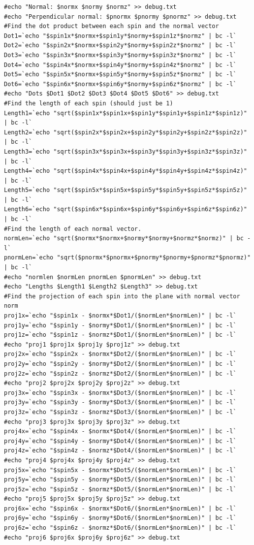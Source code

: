 \documentclass{article}
\begin{document}
\begin{lstlisting}
#echo "Normal: $normx $normy $normz" >> debug.txt
#echo "Perpendicular normal: $pnormx $pnormy $pnormz" >> debug.txt
#Find the dot product between each spin and the normal vector 
Dot1=`echo "$spin1x*$normx+$spin1y*$normy+$spin1z*$normz" | bc -l`
Dot2=`echo "$spin2x*$normx+$spin2y*$normy+$spin2z*$normz" | bc -l`
Dot3=`echo "$spin3x*$normx+$spin3y*$normy+$spin3z*$normz" | bc -l`
Dot4=`echo "$spin4x*$normx+$spin4y*$normy+$spin4z*$normz" | bc -l`
Dot5=`echo "$spin5x*$normx+$spin5y*$normy+$spin5z*$normz" | bc -l`
Dot6=`echo "$spin6x*$normx+$spin6y*$normy+$spin6z*$normz" | bc -l`
#echo "Dots $Dot1 $Dot2 $Dot3 $Dot4 $Dot5 $Dot6" >> debug.txt
#Find the length of each spin (should just be 1)
Length1=`echo "sqrt($spin1x*$spin1x+$spin1y*$spin1y+$spin1z*$spin1z)" | bc -l`
Length2=`echo "sqrt($spin2x*$spin2x+$spin2y*$spin2y+$spin2z*$spin2z)" | bc -l`
Length3=`echo "sqrt($spin3x*$spin3x+$spin3y*$spin3y+$spin3z*$spin3z)" | bc -l`
Length4=`echo "sqrt($spin4x*$spin4x+$spin4y*$spin4y+$spin4z*$spin4z)" | bc -l`
Length5=`echo "sqrt($spin5x*$spin5x+$spin5y*$spin5y+$spin5z*$spin5z)" | bc -l`
Length6=`echo "sqrt($spin6x*$spin6x+$spin6y*$spin6y+$spin6z*$spin6z)" | bc -l`
#Find the length of each normal vector.
normLen=`echo "sqrt($normx*$normx+$normy*$normy+$normz*$normz)" | bc -l`
pnormLen=`echo "sqrt($pnormx*$pnormx+$pnormy*$pnormy+$pnormz*$pnormz)" | bc -l`
#echo "normlen $normLen pnormLen $pnormLen" >> debug.txt
#echo "Lengths $Length1 $Length2 $Length3" >> debug.txt
#Find the projection of each spin into the plane with normal vector norm
proj1x=`echo "$spin1x - $normx*$Dot1/($normLen*$normLen)" | bc -l`
proj1y=`echo "$spin1y - $normy*$Dot1/($normLen*$normLen)" | bc -l`
proj1z=`echo "$spin1z - $normz*$Dot1/($normLen*$normLen)" | bc -l`
#echo "proj1 $proj1x $proj1y $proj1z" >> debug.txt
proj2x=`echo "$spin2x - $normx*$Dot2/($normLen*$normLen)" | bc -l`
proj2y=`echo "$spin2y - $normy*$Dot2/($normLen*$normLen)" | bc -l`
proj2z=`echo "$spin2z - $normz*$Dot2/($normLen*$normLen)" | bc -l`
#echo "proj2 $proj2x $proj2y $proj2z" >> debug.txt
proj3x=`echo "$spin3x - $normx*$Dot3/($normLen*$normLen)" | bc -l`
proj3y=`echo "$spin3y - $normy*$Dot3/($normLen*$normLen)" | bc -l`
proj3z=`echo "$spin3z - $normz*$Dot3/($normLen*$normLen)" | bc -l`
#echo "proj3 $proj3x $proj3y $proj3z" >> debug.txt
proj4x=`echo "$spin4x - $normx*$Dot4/($normLen*$normLen)" | bc -l`
proj4y=`echo "$spin4y - $normy*$Dot4/($normLen*$normLen)" | bc -l`
proj4z=`echo "$spin4z - $normz*$Dot4/($normLen*$normLen)" | bc -l`
#echo "proj4 $proj4x $proj4y $proj4z" >> debug.txt
proj5x=`echo "$spin5x - $normx*$Dot5/($normLen*$normLen)" | bc -l`
proj5y=`echo "$spin5y - $normy*$Dot5/($normLen*$normLen)" | bc -l`
proj5z=`echo "$spin5z - $normz*$Dot5/($normLen*$normLen)" | bc -l`
#echo "proj5 $proj5x $proj5y $proj5z" >> debug.txt
proj6x=`echo "$spin6x - $normx*$Dot6/($normLen*$normLen)" | bc -l`
proj6y=`echo "$spin6y - $normy*$Dot6/($normLen*$normLen)" | bc -l`
proj6z=`echo "$spin6z - $normz*$Dot6/($normLen*$normLen)" | bc -l`
#echo "proj6 $proj6x $proj6y $proj6z" >> debug.txt


\end{lstlisting}
\end{document}
